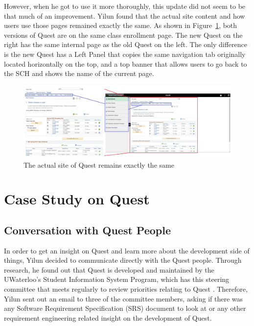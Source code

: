 \documentclass[conference]{IEEEtran}
\begin{document}
However, when he got to use it more thoroughly, this update did not seem to be that much of an improvement. Yilun found that the actual site content and how users use those pages remained exactly the same. As shown in Figure~\ref{fig:figure4}, both versions of Quest are on the same class enrollment page. The new Quest on the right has the same internal page as the old Quest on the left. The only difference is the new Quest has a Left Panel that copies the same navigation tab originally located horizontally on the top, and a top banner that allows users to go back to the SCH and shows the name of the current page.

\begin{figure}[htdp]
\centering
  \includegraphics[width=1\columnwidth]{a.png}
  \caption{The actual site of Quest remains exactly the same}
  \label{fig:figure4}
\end{figure}

\section{Case Study on Quest}  \label{case study on quest}
\subsection{Conversation with Quest People}
In order to get an insight on Quest and learn more about the development side of things, Yilun decided to communicate directly with the Quest people. Through research, he found out that Quest is developed and maintained by the UWaterloo's Student Information System Program, which has this steering committee that meets regularly to review priorities relating to Quest \cite{b5}. Therefore, Yilun sent out an email to three of the committee members, asking if there was any Software Requirement Specification (SRS) document to look at or any other requirement engineering related insight on the development of Quest. 
\end{document}
